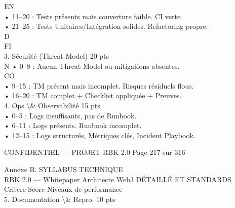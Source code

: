 \vspace{0.5em}
\vspace{0.5em}
\vspace{0.5em}
\vspace{0.5em}
EN\\
• 11–20 : Tests présents mais couverture faible. CI verte.\\
• 21–25 : Tests Unitaires/Intégration solides. Refactoring propre.\\
\vspace{0.5em}
\vspace{0.5em}
\vspace{0.5em}
\vspace{0.5em}
D\\
FI\\
3. Sécurité (Threat Model)        20 pts\\
\vspace{0.5em}
N      • 0–8 : Aucun Threat Model ou mitigations absentes.\\
CO\\
• 9–15 : TM présent mais incomplet. Risques résiduels flous.\\
• 16–20 : TM complet + Checklist appliquée + Preuves.\\
\vspace{0.5em}
4. Ops \textbackslash{}& Observabilité            15 pts\\
• 0–5 : Logs insuffisants, pas de Runbook.\\
• 6–11 : Logs présents. Runbook incomplet.\\
• 12–15 : Logs structurés, Métriques clés, Incident Playbook.\\
\vspace{0.5em}
\vspace{0.5em}
\vspace{0.5em}
\vspace{0.5em}
\begin{confidential}CONFIDENTIEL — PROJET RBK 2.0                             Page 217 sur 316\end{confidential}
Annexe B. SYLLABUS TECHNIQUE\\
RBK 2.0 — Whitepaper Architecte Web3                                                                          DÉTAILLÉ ET STANDARDS\\
\vspace{0.5em}
\vspace{0.5em}
Critère                   Score                      Niveaux de performance\\
5. Documentation \textbackslash{}& Repro. 10 pts\\

